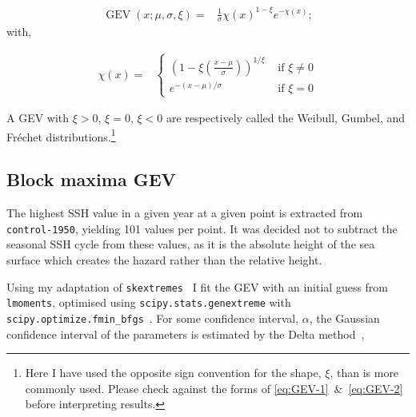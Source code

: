     \begin{align}
    \operatorname{GEV}(x; \mu, \sigma, \xi)=&
    \frac{1}{\sigma} \chi(x)^{1-\xi} e^{-\chi(x)}; \tag{GEV-1}
    \label{eq:GEV-1}
    \end{align}
    with,
    \iffalse
    \begin{align}
        \chi(x)=&\{
               \begin{array}{ll}
                    \left(1- \xi\left(\frac{x-
                    \mu}{\sigma} \right)\right)^{\frac{1}{\xi}} &
                     \text { if } \xi \neq 0 \\
                    e^{-\frac{x-\mu}{\sigma}} &
                    \text { if } \xi=0 \\

              \end{array}.
    \tag{GEV-2} \label{eq:GEV-2}

    \end{align}
    \fi
\begin{align}
    \chi(x)=&\left\{\begin{array}{ll}
    \left(1-\xi\left(\frac{x-\mu}{\sigma}\right)\right)^{1 / \xi} & \text { if } \xi \neq 0 \\
    e^{-(x-\mu) / \sigma} & \text { if } \xi=0 \tag{GEV-2}
    \end{array}\right.
   \label{eq:GEV-2}
\end{align}


    A GEV with $\xi>0$, $\xi=0$, $\xi<0$ are
    respectively called the Weibull, Gumbel, and Fr\'echet
    distributions.\footnote{Here I have used the opposite sign convention for
    the shape, $\xi$, than is more commonly used. Please check against the
    forms of \ref{eq:GEV-1}~\&~\ref{eq:GEV-2} before interpreting results. }

\subsection{Block maxima GEV}
The highest SSH value in a given year at a given point
is extracted from \texttt{control-1950}, yielding 101 values per point.
It was decided not to subtract the seasonal SSH cycle from these
values, as it is the absolute height of the sea surface which
creates the hazard rather than the relative height.






Using my adaptation of \texttt{skextremes}~\cite{skextremes} I fit the
GEV with an initial guess from \texttt{lmoments}, optimised using
\texttt{scipy.stats.genextreme} with \texttt{scipy.optimize.fmin\_bfgs}~\cite{2020SciPy-NMeth}.
For some confidence interval, $\alpha$, the Gaussian confidence interval of the parameters is
estimated by the Delta method~\cite{coles2001introduction},

